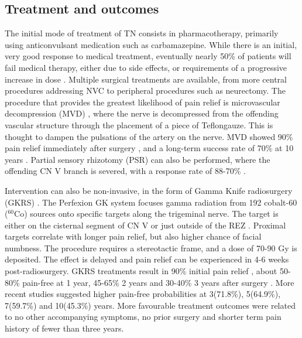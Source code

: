 \subsection{Treatment and outcomes}

The initial mode of treatment of TN consists in pharmacotherapy, primarily using anticonvulsant medication such as carbamazepine. While there is an initial, very good response to medical treatment, eventually nearly 50\% of patients will fail medical therapy, either due to side effects, or requirements of a progressive increase in dose \cite{Rappaport1994}. Multiple surgical treatments are available, from more central procedures addressing NVC to peripheral procedures such as neurectomy. The procedure that provides the greatest likelihood of pain relief is microvascular decompression (MVD) \cite{Lovely1997}, where the nerve is decompressed from the offending vascular structure through the placement of a piece of Teflon\textcopyright gauze. This is thought to dampen the pulsations of the artery on the nerve. MVD showed 90\% pain relief immediately after surgery \cite{Zakrzewska2005}, and a long-term success rate of 70\% at 10 years \cite{Barker1996}.
Partial sensory rhizotomy (PSR) can also be performed, where the offending CN V branch is severed, with a response rate of 88-70\% \cite{Young1993,Zakrzewska2005}. 

Intervention can also be non-invasive, in the form of Gamma Knife radiosurgery (GKRS) \cite{Hodaie2012g}. The Perfexion GK system focuses gamma radiation from 192 cobalt-60 ($^{60}$Co) sources onto specific targets along the trigeminal nerve. The target is either on the cisternal segment of CN V or just outside of the REZ \cite{Daugherty2015}. Proximal targets correlate with longer pain relief, but also higher chance of facial numbness\cite{Xu2014}. The procedure requires a stereotactic frame, and a dose of 70-90 Gy is deposited. The effect is delayed and pain relief can be experienced in 4-6 weeks post-radiosurgery. GKRS treatments result in 90\% initial pain relief \cite{Tuleasca2015,Kondziolka2010}, about 50-80\% pain-free at 1 year, 45-65\% 2 years and 30-40\% 3 years after surgery \cite{Kondziolka2010,Sheehan2005}. More recent studies suggested higher pain-free probabilities at 3(71.8\%), 5(64.9\%), 7(59.7\%) and 10(45.3\%) years\cite{Tuleasca2015}. More favourable treatment outcomes were related to no other accompanying symptoms, no prior surgery and shorter term pain history of fewer than three years. 
